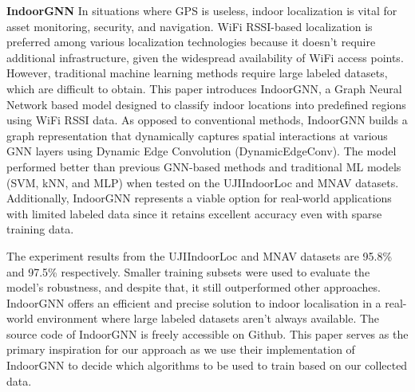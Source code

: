 \documentclass[conference]{IEEEtran}
\begin{document}
	{\bfseries IndoorGNN}
	In situations where GPS is useless, indoor localization is vital for asset monitoring, security, and navigation. WiFi RSSI-based localization is preferred among various localization technologies because it doesn't require additional infrastructure, given the widespread availability of WiFi access points. However, traditional machine learning methods require large labeled datasets, which are difficult to obtain. This paper introduces IndoorGNN, a Graph Neural Network based model designed to classify indoor locations into predefined regions using WiFi RSSI data. As opposed to conventional methods, IndoorGNN builds a graph representation that dynamically captures spatial interactions at various GNN layers using Dynamic Edge Convolution (DynamicEdgeConv). The model performed better than previous GNN-based methods and traditional ML models (SVM, kNN, and MLP) when tested on the UJIIndoorLoc and MNAV datasets. Additionally, IndoorGNN represents a viable option for real-world applications with limited labeled data since it retains excellent accuracy even with sparse training data.
	
	The experiment results from the UJIIndoorLoc and MNAV datasets are 95.8\% and 97.5\% respectively. Smaller training subsets were used to evaluate the model's robustness, and despite that, it still outperformed other approaches. IndoorGNN offers an efficient and precise solution to indoor localisation in a real-world environment where large labeled datasets aren't always available. The source code of IndoorGNN is freely accessible on Github. This paper serves as the primary inspiration for our approach as we use their implementation of IndoorGNN to decide which algorithms to be used to train based on our collected data. 
	
\end{document}
